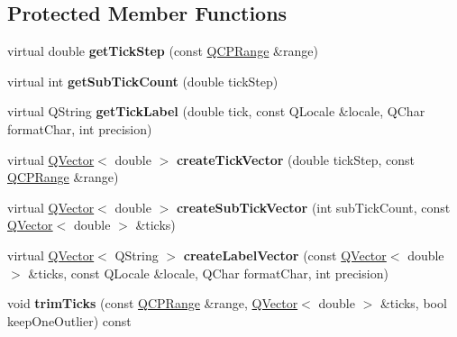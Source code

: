 \subsection*{Protected Member Functions}
\begin{DoxyCompactItemize}
\item 
\mbox{\label{class_q_c_p_axis_ticker_a910d69bcec2de37e92d8d4e1ecf201e2}} 
virtual double {\bfseries get\+Tick\+Step} (const \hyperlink{class_q_c_p_range}{Q\+C\+P\+Range} \&range)
\item 
\mbox{\label{class_q_c_p_axis_ticker_a4ccc403ced7a1457ce6ba293509933c8}} 
virtual int {\bfseries get\+Sub\+Tick\+Count} (double tick\+Step)
\item 
\mbox{\label{class_q_c_p_axis_ticker_a8201eb4aa8be192bf786b126eb5ee089}} 
virtual Q\+String {\bfseries get\+Tick\+Label} (double tick, const Q\+Locale \&locale, Q\+Char format\+Char, int precision)
\item 
\mbox{\label{class_q_c_p_axis_ticker_af4645a824c7bd2ca8fc7e86ebf9055bd}} 
virtual \hyperlink{class_q_vector}{Q\+Vector}$<$ double $>$ {\bfseries create\+Tick\+Vector} (double tick\+Step, const \hyperlink{class_q_c_p_range}{Q\+C\+P\+Range} \&range)
\item 
\mbox{\label{class_q_c_p_axis_ticker_a9a6435723fa0bd366d1ea4c2cff7c33f}} 
virtual \hyperlink{class_q_vector}{Q\+Vector}$<$ double $>$ {\bfseries create\+Sub\+Tick\+Vector} (int sub\+Tick\+Count, const \hyperlink{class_q_vector}{Q\+Vector}$<$ double $>$ \&ticks)
\item 
\mbox{\label{class_q_c_p_axis_ticker_a804050e408f37a0b9770c6654ebe6aa7}} 
virtual \hyperlink{class_q_vector}{Q\+Vector}$<$ Q\+String $>$ {\bfseries create\+Label\+Vector} (const \hyperlink{class_q_vector}{Q\+Vector}$<$ double $>$ \&ticks, const Q\+Locale \&locale, Q\+Char format\+Char, int precision)
\item 
\mbox{\label{class_q_c_p_axis_ticker_ab28cc1ab549489be7975f5ce7e717916}} 
void {\bfseries trim\+Ticks} (const \hyperlink{class_q_c_p_range}{Q\+C\+P\+Range} \&range, \hyperlink{class_q_vector}{Q\+Vector}$<$ double $>$ \&ticks, bool keep\+One\+Outlier) const

\end{DoxyCompactItemize}
